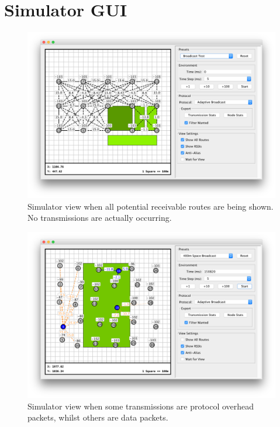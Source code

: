 \chapter{Simulator GUI}\label{sec:simulator_pictures}
\begin{figure}[H]
    \centering
   	\includegraphics[width=\textwidth]{Figures/simulator_all_routes}
    \caption[Simulator view with all routes shown]{
    	Simulator view when all potential receivable routes are being shown. No transmissions are actually occurring.
    }
\end{figure}

\begin{figure}[H]
    \centering
   	\includegraphics[width=\textwidth]{Figures/simulator_overhead}
    \caption[Simulator view with data and overhead]{
    	Simulator view when some transmissions are protocol overhead packets, whilst others are data packets.
    }
\end{figure}

